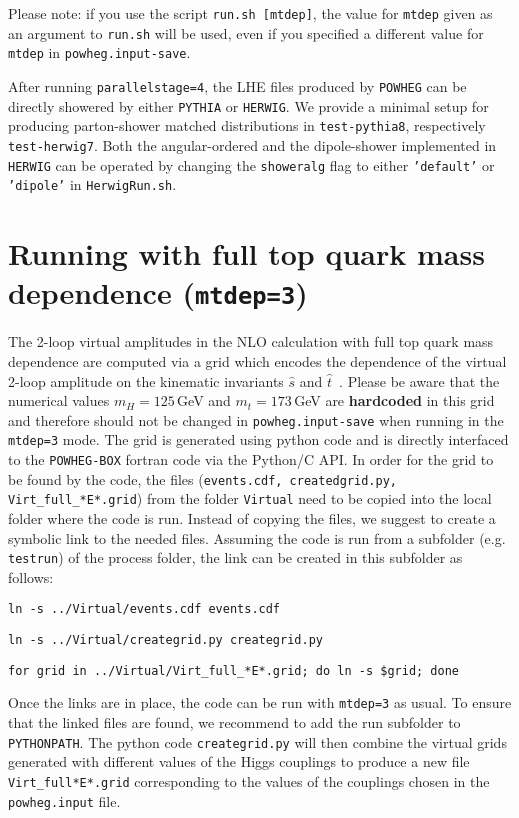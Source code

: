 \documentclass[paper]{JHEP3}
\newcommand\POWHEG{{\tt POWHEG}}
\newcommand\POWHEGBOX{{\tt POWHEG-BOX}}
\newcommand\HERWIG{{\tt HERWIG}}
\newcommand\PYTHIA{{\tt PYTHIA}}
\begin{document}
\noindent Please note: if you use the script {\tt run.sh [mtdep]}, the value for {\tt mtdep} given as an argument to {\tt run.sh} will be used, even if you specified a different value for {\tt mtdep} in {\tt powheg.input-save}.

After running {\tt parallelstage=4}, the LHE files produced by \POWHEG{} can be directly showered by either \PYTHIA{} or \HERWIG{}. We provide a minimal setup for producing parton-shower matched distributions in {\tt test-pythia8}, respectively {\tt test-herwig7}. Both the angular-ordered and the dipole-shower implemented in \HERWIG{} can be operated by changing the {\tt showeralg} flag to either {\tt 'default'} or {\tt 'dipole'} in {\tt HerwigRun.sh}.

\section{Running with full top quark mass dependence ({\tt mtdep=3})}
The 2-loop virtual amplitudes in the NLO calculation with full top quark mass dependence are computed via a grid
which encodes the dependence of the virtual 2-loop amplitude on the
kinematic invariants $\hat{s}$ and
$\hat{t}$~\cite{Heinrich:2017kxx}. Please be aware that the numerical
values $m_H=125$\,GeV and $m_t=173$\,GeV are {\bf hardcoded} in this
grid and therefore should not be changed in {\tt powheg.input-save} when running in the {\tt mtdep=3} mode.
The grid is generated using python code and is directly interfaced to the
\POWHEGBOX{} fortran code via the Python/C API. In order for the grid to be found by the code, the
files ({\tt events.cdf, createdgrid.py, Virt\_full\_*E*.grid}) from the
folder {\tt Virtual} need to be copied into the local folder where the
code is run. Instead of copying the files, we suggest to create a
symbolic link to the needed files. Assuming the code is run from a
subfolder (e.g. {\tt testrun}) of the process folder, the link can be created in this subfolder as follows:
\begin{description}
\item{\tt ln -s ../Virtual/events.cdf events.cdf}
\item{\tt ln -s ../Virtual/creategrid.py creategrid.py}
\item{\tt for grid in ../Virtual/Virt\_full\_*E*.grid; do ln -s \$grid; done}
\end{description}
Once the links are in place, the code can be run with {\tt mtdep=3} as
usual. To ensure that the linked files are found, we recommend to add the run subfolder to {\tt PYTHONPATH}. 
The python code {\tt creategrid.py} will then combine the virtual grids generated with different values of the Higgs couplings
to produce a new file {\tt Virt\_full*E*.grid} corresponding to the values of the couplings chosen in the {\tt powheg.input} file.
\end{document}
